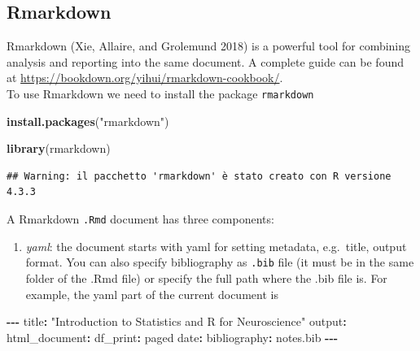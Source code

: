 \documentclass[
]{article}
\newenvironment{Shaded}{\begin{snugshade}}{\end{snugshade}}
\newcommand{\FunctionTok}[1]{\textcolor[rgb]{0.13,0.29,0.53}{\textbf{#1}}}
\newcommand{\NormalTok}[1]{#1}
\newcommand{\SpecialCharTok}[1]{\textcolor[rgb]{0.81,0.36,0.00}{\textbf{#1}}}
\newcommand{\StringTok}[1]{\textcolor[rgb]{0.31,0.60,0.02}{#1}}
\providecommand{\tightlist}{%
  \setlength{\itemsep}{0pt}\setlength{\parskip}{0pt}}
\begin{document}
\hypertarget{rmarkdown}{%
\subsection{Rmarkdown}\label{rmarkdown}}

Rmarkdown (Xie, Allaire, and Grolemund 2018) is a powerful tool for
combining analysis and reporting into the same document. A complete
guide can be found at
\url{https://bookdown.org/yihui/rmarkdown-cookbook/}.\\
To use Rmarkdown we need to install the package \texttt{rmarkdown}

\begin{Shaded}
\begin{Highlighting}[]
\FunctionTok{install.packages}\NormalTok{(}\StringTok{"rmarkdown"}\NormalTok{)}
\end{Highlighting}
\end{Shaded}

\begin{Shaded}
\begin{Highlighting}[]
\FunctionTok{library}\NormalTok{(rmarkdown)}
\end{Highlighting}
\end{Shaded}

\begin{verbatim}
## Warning: il pacchetto 'rmarkdown' è stato creato con R versione 4.3.3
\end{verbatim}

A Rmarkdown \texttt{.Rmd} document has three components:

\begin{enumerate}
\def\labelenumi{\arabic{enumi}.}
\tightlist
\item
  \emph{yaml}: the document starts with yaml for setting metadata,
  e.g.~title, output format. You can also specify bibliography as
  \texttt{.bib} file (it must be in the same folder of the .Rmd file) or
  specify the full path where the .bib file is. For example, the yaml
  part of the current document is
\end{enumerate}

\begin{Shaded}
\begin{Highlighting}[]
\SpecialCharTok{{-}{-}{-}}
\NormalTok{title}\SpecialCharTok{:} \StringTok{"Introduction to Statistics and R for Neuroscience"}
\NormalTok{output}\SpecialCharTok{:}
\NormalTok{html\_document}\SpecialCharTok{:}
\NormalTok{    df\_print}\SpecialCharTok{:}\NormalTok{ paged}
\NormalTok{date}\SpecialCharTok{:} \StringTok{\textquotesingle{}\textquotesingle{}}
\NormalTok{bibliography}\SpecialCharTok{:}\NormalTok{ notes.bib}
\SpecialCharTok{{-}{-}{-}}
\end{Highlighting}
\end{Shaded}
\end{document}
